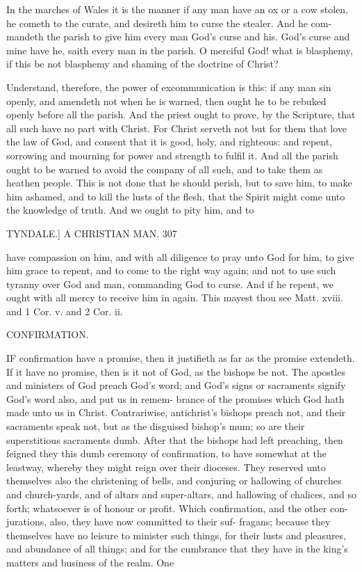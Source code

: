 \documentclass{custom}
\begin{document}
{In the marches of Wales it is the manner if any man 
have an ox or a cow stolen, he cometh to the curate, 
and desireth him to curse the stealer. And he com- 
mandeth the parish to give him every man God's curse and 
his. God's curse and mine have he, saith every man in 
the parish. O merciful God! what is blasphemy, if 
this be not blasphemy and shaming of the doctrine of 
Christ? 

Understand, therefore, the power of excommunication 
is this: if any man sin openly, and amendeth not when 
he is warned, then ought he to be rebuked openly before 
all the parish. And the priest ought to prove, by the 
Scripture, that all such have no part with Christ. For 
Christ serveth not but for them that love the law of God, 
and consent that it is good, holy, and righteous: and 
repent, sorrowing and mourning for power and strength 
to fulfil it. And all the parish ought to be warned to 
avoid the company of all such, and to take them as 
heathen people. This is not done that he should perish, 
but to save him, to make him ashamed, and to kill the 
lusts of the flesh, that the Spirit might come unto the 
knowledge of truth. And we ought to pity him, and to 


TYNDALE.]
A CHRISTIAN MAN.
307

have compassion on him, and with all diligence to pray 
unto God for him, to give him grace to repent, and to 
come to the right way again; and not to use such tyranny 
over God and man, commanding God to curse. And if 
he repent, we ought with all mercy to receive him in 
again. This mayest thou see Matt. xviii. and 1 Cor. v. 
and 2 Cor. ii. 


CONFIRMATION. 

IF confirmation have a promise, then it justifieth as far 
as the promise extendeth. If it have no promise, then 
is it not of God, as the bishops be not. The apostles and 
ministers of God preach God's word; and God's signs or 
sacraments signify God's word also, and put us in remem- 
brance of the promises which God hath made unto us in 
Christ. Contrariwise, antichrist's bishops preach not, 
and their sacraments speak not, but as the disguised 
bishop's mum; so are their superstitious sacraments 
dumb. After that the bishops had left preaching, then 
feigned they this dumb ceremony of confirmation, to have 
somewhat at the leastway, whereby they might reign over 
their dioceses. They reserved unto themselves also the 
christening of bells, and conjuring or hallowing of 
churches and church-yards, and of altars and super-altars, 
and hallowing of chalices, and so forth; whatsoever is of 
honour or profit. Which confirmation, and the other con- 
jurations, also, they have now committed to their suf- 
fragans; because they themselves have no leisure to 
minister such things, for their lusts and pleasures, and 
abundance of all things; and for the cumbrance that they 
have in the king's matters and business of the realm. One 

}
\end{document}
